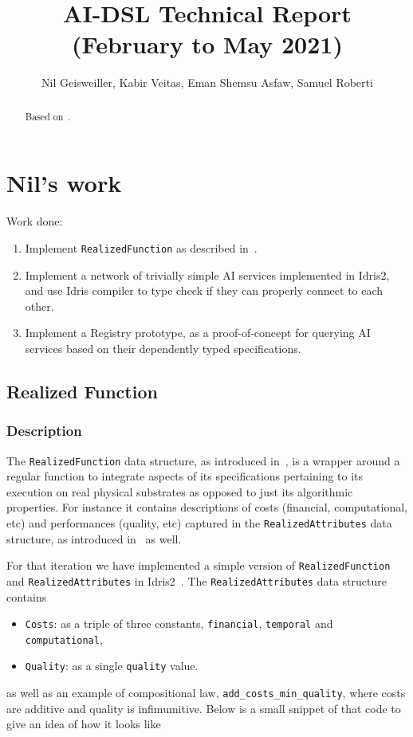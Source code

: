 \documentclass[]{report}
\newcommand{\nil}[2][]{\todo[color=purple,author=nil, #1]{#2}}
\begin{document}
\title{AI-DSL Technical Report (February to May 2021)}
\author{Nil Geisweiller, Kabir Veitas, Eman Shemsu Asfaw, Samuel Roberti}
\maketitle

\begin{abstract}
Based on~\cite{GoertzelGeisweillerBlog}.
\end{abstract}

\tableofcontents

\chapter{Nil's work}

Work done:
\begin{enumerate}
\item Implement \texttt{RealizedFunction} as described
  in~\cite{GoertzelGeisweillerBlog}.
\item Implement a network of trivially simple AI services implemented
  in Idris2, and use Idris compiler to type check if they can properly
  connect to each other.
\item Implement a Registry prototype, as a proof-of-concept for
  querying AI services based on their dependently typed
  specifications.
\end{enumerate}

\section{Realized Function}
\label{realized_function}

\subsection{Description}

The \texttt{RealizedFunction} data structure, as introduced
in~\cite{GoertzelGeisweillerBlog}, is a wrapper around a regular
function to integrate aspects of its specifications pertaining to its
execution on real physical substrates as opposed to just its
algorithmic properties.  For instance it contains descriptions of
costs (financial, computational, etc) and performances (quality, etc)
captured in the \texttt{RealizedAttributes} data structure, as
introduced in~\cite{GoertzelGeisweillerBlog} as well.

For that iteration we have implemented a simple version of
\texttt{RealizedFunction} and \texttt{RealizedAttributes} in
Idris2~\cite{Idris}.  The \texttt{RealizedAttributes} data structure
contains
\begin{itemize}
\item \texttt{Costs}: as a triple of three constants,
  \texttt{financial}, \texttt{temporal} and \texttt{computational},
\item \texttt{Quality}: as a single \texttt{quality} value.
\end{itemize}
as well as an example of compositional law,
\texttt{add\_costs\_min\_quality}, where costs are additive and
quality is infimumitive\nil{is there a word for that?}.  Below is a
small snippet of that code to give an idea of how it looks like
\end{document}
